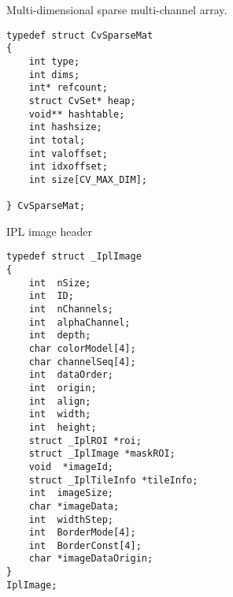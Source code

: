 \label{CvSparseMat}
Multi-dimensional sparse multi-channel array.

\begin{lstlisting}
typedef struct CvSparseMat
{
    int type;
    int dims; 
    int* refcount; 
    struct CvSet* heap; 
    void** hashtable; 
    int hashsize;
    int total; 
    int valoffset; 
    int idxoffset; 
    int size[CV_MAX_DIM]; 

} CvSparseMat;
\end{lstlisting}

\begin{description}
\end{description}

\label{IplImage}
IPL image header

\begin{lstlisting}
typedef struct _IplImage
{
    int  nSize;         
    int  ID;            
    int  nChannels;     
    int  alphaChannel;  
    int  depth;         
    char colorModel[4]; 
    char channelSeq[4]; 
    int  dataOrder;     
    int  origin;        
    int  align;         
    int  width;         
    int  height;        
    struct _IplROI *roi; 
    struct _IplImage *maskROI; 
    void  *imageId;     
    struct _IplTileInfo *tileInfo; 
    int  imageSize;                             
    char *imageData;  
    int  widthStep;   
    int  BorderMode[4]; 
    int  BorderConst[4]; 
    char *imageDataOrigin; 
}
IplImage;
\end{lstlisting}

